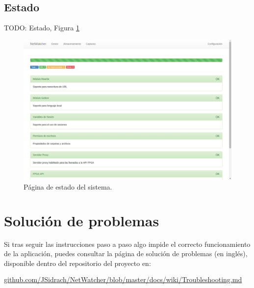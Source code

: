\subsection{Estado\label{extra:manual:estado}}

TODO: Estado, Figura \ref{fig:captura:estado}
\begin{figure}[H]
  \centering
  \includegraphics[width=\textwidth,clip=true]{graphics/capturas/estado}
  \caption{Página de estado del sistema.}
  \label{fig:captura:estado}
\end{figure}


\section{Solución de problemas\label{extra:manual:solucion}}

Si tras seguir las instrucciones paso a paso algo impide el correcto funcionamiento de la aplicación, puedes consultar la página de solución de problemas (en inglés), disponible dentro del repositorio del proyecto en:

\href{https://github.com/JSidrach/NetWatcher/blob/master/docs/wiki/Troubleshooting.md}{github.com/JSidrach/NetWatcher/blob/master/docs/wiki/Troubleshooting.md}